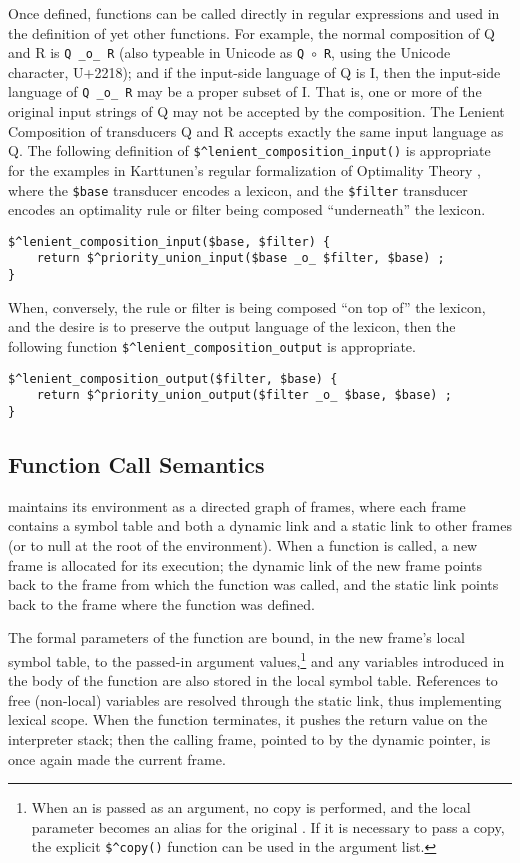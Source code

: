 Once defined, functions can be called directly in regular
expressions and used in the definition of yet other functions.  For
example, the normal composition of Q and R 
is \verb!Q _o_ R! (also typeable in Unicode as \verb!Q!~$\circ$~\verb!R!, using the
Unicode  character, U+2218); and if the input-side language of Q is I, then
the input-side language of \verb!Q _o_ R! may be a proper subset of I.
That is, one or more of the original input strings of Q may not be accepted by the 
composition.  The Lenient Composition of transducers Q and R accepts exactly the 
same input language as Q.  The
following definition of \verb!$^lenient_composition_input()! is
appropriate for the examples in Karttunen's regular formalization of Optimality Theory
\citep{karttunen:1998}, where the \verb!$base!
transducer encodes a lexicon, and the \verb!$filter! transducer
encodes an optimality rule or filter being composed
``underneath''
the lexicon.

\begin{Verbatim}
$^lenient_composition_input($base, $filter) {
    return $^priority_union_input($base _o_ $filter, $base) ;
}
\end{Verbatim}

\noindent
When, conversely, the rule or filter is being
composed ``on top of'' the lexicon, and the desire is to
preserve the output language of the lexicon, then the following
function \verb!$^lenient_composition_output! is appropriate.

\begin{Verbatim}
$^lenient_composition_output($filter, $base) {
    return $^priority_union_output($filter _o_ $base, $base) ;
}
\end{Verbatim}



\subsection{Function Call Semantics}

\Kleene{} maintains its environment as a directed graph of frames,
where each frame
contains a symbol table and both a dynamic link and a static link to other frames (or to null at the root of the environment).  When a function is called, a new
frame is allocated for its execution; the dynamic link of the
new frame points back to the frame
from which the function was called, and the static link points back to the
frame where the function was defined.  

The formal parameters of the function are bound, in the new frame's local
symbol table, to the passed-in argument values,\footnote{When an \fsm{} is passed as an argument, no copy is performed, and the local
parameter becomes an alias for the original \fsm{}.  If it is
necessary to pass a copy, the explicit \verb!$^copy()! function can be used
in the argument list.}  and any variables introduced in
the body of the function are also stored in the local symbol
table.  References to free (non-local) variables are resolved
through the static link, thus implementing lexical scope.  When the
function terminates, it pushes the return value on the interpreter stack; then
the calling frame, pointed to by the dynamic
pointer, is once again made the current frame.

